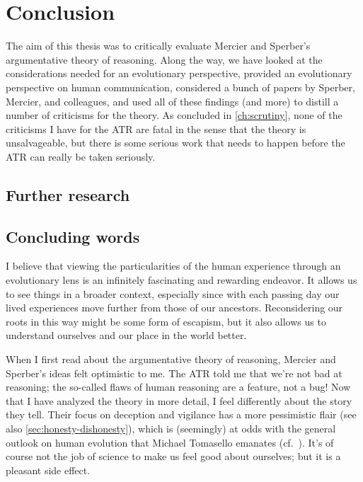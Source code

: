 \chapter{Conclusion}
\label{ch:conclusion}

The aim of this thesis was to critically evaluate Mercier and Sperber's argumentative theory of reasoning.
Along the way, we have looked at the considerations needed for an evolutionary perspective, provided an evolutionary perspective on human communication, considered a bunch of papers by Sperber, Mercier, and colleagues, and used all of these findings (and more) to distill a number of criticisms for the theory. 
As concluded in \cref{ch:scrutiny}, none of the criticisms I have for the ATR are fatal in the sense that the theory is unsalvageable, but there is some serious work that needs to happen before the ATR can really be taken seriously.

\section{Further research}

\section{Concluding words}
I believe that viewing the particularities of the human experience through an evolutionary lens is an infinitely fascinating and rewarding endeavor. It allows us to see things in a broader context, especially since with each passing day our lived experiences move further from those of our ancestors. Reconsidering our roots in this way might be some form of escapism, but it also allows us to understand ourselves and our place in the world better.

When I first read about the argumentative theory of reasoning, Mercier and Sperber's ideas felt optimistic to me. The ATR told me that we're not bad at reasoning; the so-called flaws of human reasoning are a feature, not a bug! Now that I have analyzed the theory in more detail, I feel differently about the story they tell. Their focus on deception and vigilance has a more pessimistic flair (see also \cref{sec:honesty-dishonesty}), which is (seemingly) at odds with the general outlook on human evolution that Michael Tomasello emanates (cf.~\citet{Tomasello09}). It's of course not the job of science to make us feel good about ourselves; but it is a pleasant side effect.
